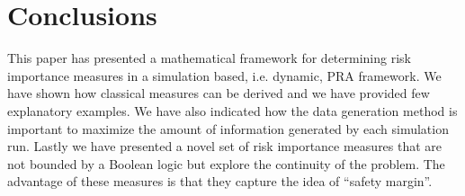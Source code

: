 \section{Conclusions}
\label{sec:conclusions}

This paper has presented a mathematical framework for determining risk 
importance measures in a simulation based, i.e. dynamic, PRA framework. 
We have shown how classical measures can be derived and
we have provided few explanatory examples. We have also indicated how the 
data generation method is important to maximize the amount of 
information generated by each simulation run. Lastly we have presented a novel
set of risk importance measures that are not bounded by a Boolean 
logic but explore the continuity of the problem. The advantage of these measures 
is that they capture the idea of ``safety margin''.
